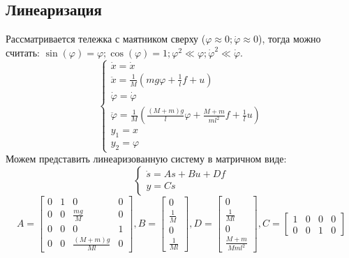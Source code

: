 \subsection{Линеаризация}
Рассматривается тележка с маятником сверху (\(\varphi \approx 0; \dot \varphi \approx 0\)), тогда можно считать: \(\sin(\varphi) = \varphi; \cos(\varphi) = 1; \varphi ^ 2 \ll \varphi; \dot \varphi ^ 2 \ll \dot \varphi\).
\begin{equation} \label{eq:8}
  \begin{cases}
      \dot x = \dot x \\
      \ddot x = \frac{1}{M}( mg\varphi + \frac{1}{l}f + u ) \\
      \dot \varphi = \dot \varphi \\
      \ddot \varphi= \frac{1}{M}(\frac{(M+m)g}{l}\varphi + \frac{M+m}{ml^2}f + \frac{1}{l}u ) \\
      y_1 = x \\
      y_2 = \varphi
  \end{cases}
\end{equation}
Можем представить линеаризованную систему в матричном виде:
\begin{equation} \label{eq:9}
    \begin{cases}
        \dot s = As + Bu + Df \\
        y = Cs
    \end{cases}
\end{equation}
\begin{equation*}
    A = \begin{bmatrix}
        0 & 1 & 0 & 0 \\
        0 & 0 & \frac{mg}{M} & 0 \\
        0 & 0 & 0 & 1 \\
        0 & 0 & \frac{(M+m)g}{Ml} & 0
    \end{bmatrix},
    B = \begin{bmatrix}
        0 \\ \frac{1}{M} \\ 0 \\ \frac{1}{Ml}
    \end{bmatrix},
    D = \begin{bmatrix}
        0 \\ \frac{1}{Ml} \\ 0 \\ \frac{M+m}{Mml^2}
    \end{bmatrix},
    C = \begin{bmatrix}
        1 & 0 & 0 & 0 \\
        0 & 0 & 1 & 0
    \end{bmatrix}
\end{equation*}

